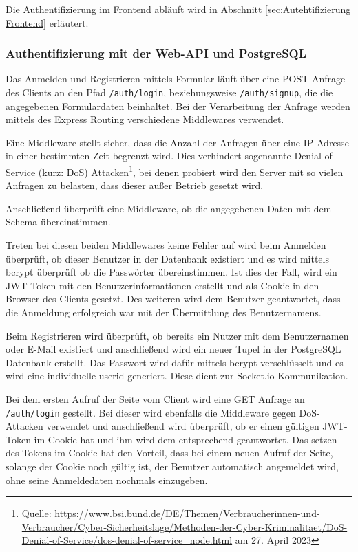 Die Authentifizierung im Frontend abläuft wird in Abschnitt \ref{sec:Autehtifizierung Frontend} erläutert.

\subsubsection{Authentifizierung mit der Web-API und PostgreSQL}
Das Anmelden und Registrieren mittels Formular läuft über eine POST Anfrage des Clients an den Pfad \verb|/auth/login|, beziehungsweise \verb|/auth/signup|, die die angegebenen Formulardaten beinhaltet. Bei der Verarbeitung der Anfrage werden mittels des Express Routing verschiedene Middlewares verwendet.

Eine Middleware stellt sicher, dass die Anzahl der Anfragen über eine IP-Adresse in einer bestimmten Zeit begrenzt wird. Dies verhindert sogenannte Denial-of-Service (kurz: DoS) Attacken\footnote{Quelle: \url{https://www.bsi.bund.de/DE/Themen/Verbraucherinnen-und-Verbraucher/Cyber-Sicherheitslage/Methoden-der-Cyber-Kriminalitaet/DoS-Denial-of-Service/dos-denial-of-service_node.html} am 27. April 2023}, bei denen probiert wird den Server mit so vielen Anfragen zu belasten, dass dieser außer Betrieb gesetzt wird.

Anschließend überprüft eine Middleware, ob die angegebenen Daten mit dem Schema übereinstimmen. 

Treten bei diesen beiden Middlewares keine Fehler auf wird beim Anmelden überprüft, ob dieser Benutzer in der Datenbank existiert und es wird mittels bcrypt überprüft ob die Passwörter übereinstimmen. Ist dies der Fall, wird ein JWT-Token mit den Benutzerinformationen erstellt und als Cookie in den Browser des Clients gesetzt. Des weiteren wird dem Benutzer geantwortet, dass die Anmeldung erfolgreich war mit der Übermittlung des Benutzernamens.

Beim Registrieren wird überprüft, ob bereits ein Nutzer mit dem Benutzernamen oder E-Mail existiert und anschließend wird ein neuer Tupel in der PostgreSQL Datenbank erstellt. Das Passwort wird dafür mittels bcrypt verschlüsselt und es wird eine individuelle userid generiert. Diese dient zur Socket.io-Kommunikation.

Bei dem ersten Aufruf der Seite vom Client wird eine GET Anfrage an \verb|/auth/login| gestellt. Bei dieser wird ebenfalls die Middleware gegen DoS-Attacken verwendet und anschließend wird überprüft, ob er einen gültigen JWT-Token im Cookie hat und ihm wird dem entsprechend geantwortet. Das setzen des Tokens im Cookie hat den Vorteil, dass bei einem neuen Aufruf der Seite, solange der Cookie noch gültig ist, der Benutzer automatisch angemeldet wird, ohne seine Anmeldedaten nochmals einzugeben.

